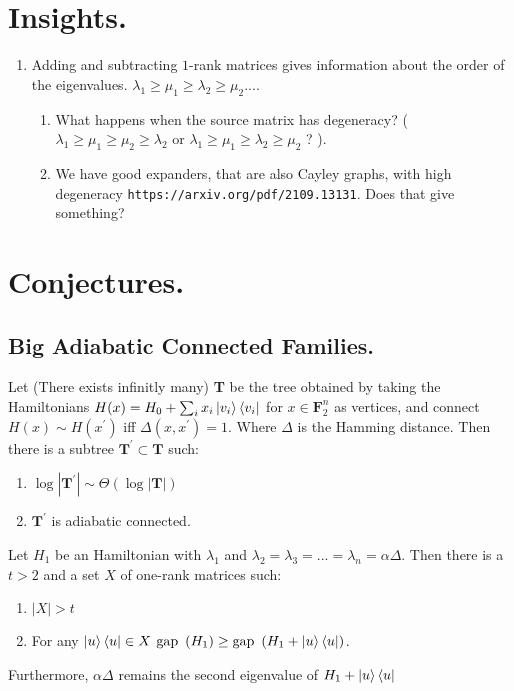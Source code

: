 \documentclass[manuscript,screen,review]{acmart}
\begin{document}
{\section{Insights.}
\begin{enumerate}
    \item Adding and subtracting $1$-rank matrices gives information about the order of the eigenvalues. $\lambda_{1}\ge \mu_{1} \ge \lambda_{2} \ge \mu_{2} ...$. 
    \begin{enumerate}
        \item What happens when the source matrix has degeneracy?  ( $\lambda_{1} \ge \mu_{1} \ge \mu_{2} \ge \lambda_{2}$ or $\lambda_{1}\ge \mu_{1} \ge \lambda_{2} \ge \mu_{2}$ ? ). 
        \item We have good expanders, that are also Cayley graphs, with high degeneracy \verb|https://arxiv.org/pdf/2109.13131|. Does that give something? 
    \end{enumerate}
\end{enumerate}

\section{Conjectures.} 

\subsection{Big Adiabatic Connected Families.}

\begin{claim}
Let (There exists infinitly many) \textbf{T} be the tree obtained by taking the Hamiltonians $H(x) = H_{0} + \sum_{i}x_i\ket{v_i}\bra{v_i}$ for $x\in \mathbf{F}_2^n$ as vertices, and connect $H(x)\sim H(x^\prime)$ iff $\Delta(x,x^\prime)= 1$. Where $\Delta$ is the Hamming distance. Then there is a subtree $\textbf{T}^\prime \subset \textbf{T}$ such:  
\begin{enumerate}
    \item $\log|\textbf{T}^\prime| \sim \Theta(\log |\textbf{T}| ) $
    \item $\textbf{T}^\prime$ is adiabatic connected. 
\end{enumerate}
\end{claim}


\begin{claim}
\label{claim:claim1}
    Let $H_{1}$ be an Hamiltonian with $\lambda_{1}$ and $\lambda_2=\lambda_{3}=...=\lambda_{n}=\alpha\Delta$. Then there is a $t > 2$ and a set $X$ of one-rank matrices such: 
    \begin{enumerate}
    \item $|X| > t$
        \item For any $\ket{u}\bra{u} \in X$  $\text{gap } \left( H_{1} \right) \ge \text{gap } \left( H_{1} + \ket{u}\bra{u}  \right) $.  
    \end{enumerate}
    Furthermore, $\alpha \Delta$ remains the second eigenvalue of $H_{1} + \ket{u}\bra{u}$
\end{claim}

}
\end{document}
